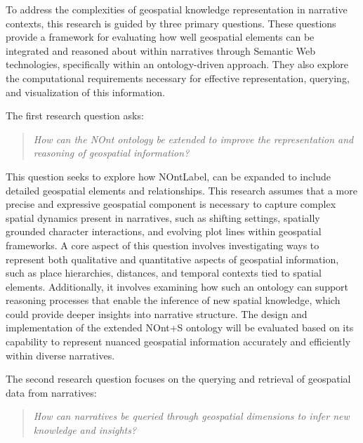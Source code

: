 To address the complexities of geospatial knowledge representation in narrative contexts, this research is guided by three primary questions. These questions provide a framework for evaluating how well geospatial elements can be integrated and reasoned about within narratives through Semantic Web technologies, specifically within an ontology-driven approach. They also explore the computational requirements necessary for effective representation, querying, and visualization of this information. 

The first research question asks:

\begin{quote}
\emph{How can the NOnt ontology be extended to improve the representation and reasoning of geospatial information?}
\end{quote}

This question seeks to explore how \acrshort{NOntLabel}\cite{meghiniRepresentingNarrativesDigital2021}, can be expanded to include detailed geospatial elements and relationships. This research assumes that a more precise and expressive geospatial component is necessary to capture complex spatial dynamics present in narratives, such as shifting settings, spatially grounded character interactions, and evolving plot lines within geospatial frameworks. A core aspect of this question involves investigating ways to represent both qualitative and quantitative aspects of geospatial information, such as place hierarchies, distances, and temporal contexts tied to spatial elements. Additionally, it involves examining how such an ontology can support reasoning processes that enable the inference of new spatial knowledge, which could provide deeper insights into narrative structure. The design and implementation of the extended NOnt+S ontology will be evaluated based on its capability to represent nuanced geospatial information accurately and efficiently within diverse narratives.

The second research question focuses on the querying and retrieval of geospatial data from narratives:

\begin{quote}
\emph{How can narratives be queried through geospatial dimensions to infer new knowledge and insights?}
\end{quote}

